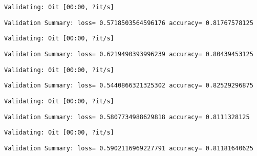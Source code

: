 \documentclass[11pt]{article}
\begin{document}
    
    \begin{Verbatim}[commandchars=\\\{\}]
Validating: 0it [00:00, ?it/s]
    \end{Verbatim}

    
    \begin{Verbatim}[commandchars=\\\{\}]
Validation Summary: loss= 0.5718503564596176 accuracy= 0.81767578125
    \end{Verbatim}

    
    \begin{Verbatim}[commandchars=\\\{\}]
Validating: 0it [00:00, ?it/s]
    \end{Verbatim}

    
    \begin{Verbatim}[commandchars=\\\{\}]
Validation Summary: loss= 0.6219490393996239 accuracy= 0.80439453125
    \end{Verbatim}

    
    \begin{Verbatim}[commandchars=\\\{\}]
Validating: 0it [00:00, ?it/s]
    \end{Verbatim}

    
    \begin{Verbatim}[commandchars=\\\{\}]
Validation Summary: loss= 0.5440866321325302 accuracy= 0.82529296875
    \end{Verbatim}

    
    \begin{Verbatim}[commandchars=\\\{\}]
Validating: 0it [00:00, ?it/s]
    \end{Verbatim}

    
    \begin{Verbatim}[commandchars=\\\{\}]
Validation Summary: loss= 0.5807734988629818 accuracy= 0.8111328125
    \end{Verbatim}

    
    \begin{Verbatim}[commandchars=\\\{\}]
Validating: 0it [00:00, ?it/s]
    \end{Verbatim}

    
    \begin{Verbatim}[commandchars=\\\{\}]
Validation Summary: loss= 0.5902116969227791 accuracy= 0.81181640625
    \end{Verbatim}
\end{document}
